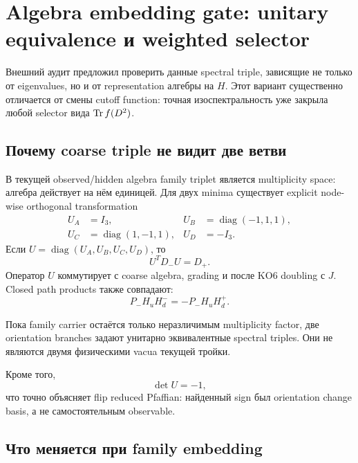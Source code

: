 \chapter{Algebra embedding gate: unitary equivalence и weighted selector}

Внешний аудит предложил проверить данные spectral triple, зависящие не только
от eigenvalues, но и от representation алгебры на \(H\). Этот вариант
существенно отличается от смены cutoff function: точная изоспектральность
уже закрыла любой selector вида \(\operatorname{Tr} f(D^2)\).

\section{Почему coarse triple не видит две ветви}

В текущей observed/hidden algebra family triplet является multiplicity space:
алгебра действует на нём единицей. Для двух minima существует explicit
node-wise orthogonal transformation
\begin{align}
 U_A&=I_3,&
 U_B&=\operatorname{diag}(-1,1,1),\\
 U_C&=\operatorname{diag}(1,-1,1),&
 U_D&=-I_3.
\end{align}
Если \(U=\operatorname{diag}(U_A,U_B,U_C,U_D)\), то
\begin{equation}
 U^T D_-U=D_+.
\end{equation}
Оператор \(U\) коммутирует с coarse algebra, grading и после KO6 doubling с
\(J\). Closed path products также совпадают:
\begin{equation}
 P_-H_uH_d^-
 =
 -P_-H_uH_d^+.
\end{equation}

\begin{theorem}
Пока family carrier остаётся только неразличимым multiplicity factor, две
orientation branches задают унитарно эквивалентные spectral triples. Они не
являются двумя физическими vacua текущей тройки.
\end{theorem}

Кроме того,
\begin{equation}
 \det U=-1,
\end{equation}
что точно объясняет flip reduced Pfaffian: найденный sign был orientation
change basis, а не самостоятельным observable.

\section{Что меняется при family embedding}

